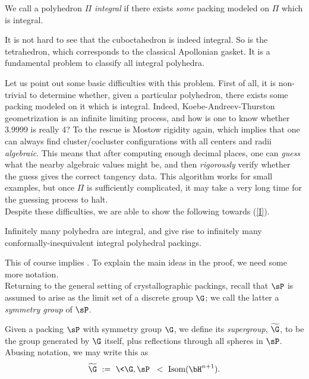 \documentclass[12pt,reqno]{amsart}
\begin{document}
\begin{Def}
We call a polyhedron $\Pi$ {\it integral} if there exists {\it some} packing 
modeled on $\Pi$ which is integral. 
\end{Def}

It is not hard to see that the cuboctahedron is indeed integral. So is the tetrahedron, which corresponds to the classical Apollonian gasket.
It is a  fundamental problem to classify all integral polyhedra.


Let us point out some basic  difficulties with this problem. First of all, it is non-trivial to determine whether, given a particular polyhedron, there exists some packing modeled on it which is integral. Indeed, Koebe-Andreev-Thurston geometrization is an infinite limiting process, and how is one to know whether 3.9999 is really 4? To the rescue is Mostow rigidity again, which implies that one can always find cluster/cocluster configurations with all centers and radii {\it algebraic}. 
This means that after computing enough decimal places, one can {\it guess} what the nearby algebraic values might be, and then {\it rigorously} verify whether the guess gives the correct tangency data. This algorithm works for small examples, but once $\Pi$ is sufficiently complicated, it may take a very long time for the guessing process to halt. 
\\

Despite these difficulties, we are able to show the following towards (\ref{I}).

\begin{thm}\label{thm:infInt}
Infinitely many polyhedra are integral, and give rise to infinitely many conformally-inequivalent integral polyhedral packings.
\end{thm}

This of course implies  . To explain the main ideas in the proof, we need some more notation.
\\

Returning to the general setting of crystallographic packings, 
recall that $\sP$ is assumed to arise as the limit set of a discrete group $\G$;
we call the latter
 a {\it symmetry group} of $\sP$.

\begin{Def}
Given a 
packing $\sP$ with %
symmetry group $\G$, we define its {\it supergroup}, $\widetilde\G$, 
to be
 the group generated by $\G$ itself, plus  reflections 
 through all spheres in $\sP$. %
Abusing notation, we may write this as
$$
\widetilde\G \ : = \ \<\G,\sP\> \ < \ \text{Isom}(\bH^{n+1}).
$$
\end{Def}
\end{document}
